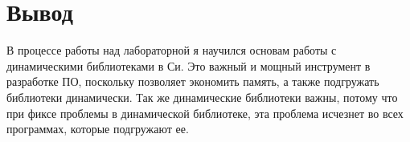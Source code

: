 \section{Вывод}

В процессе работы над лабораторной я научился основам работы с динамическими библиотеками в Си. Это важный и мощный инструмент в разработке ПО, поскольку позволяет экономить память, а также подгружать библиотеки динамически. Так же динамические библиотеки важны, потому что при фиксе проблемы в динамической библиотеке, эта проблема исчезнет во всех программах, которые подгружают ее.
